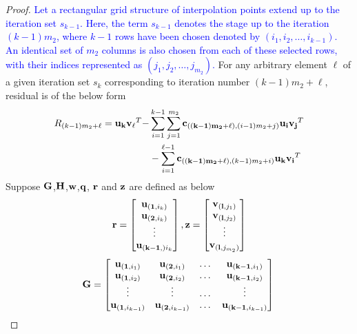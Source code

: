 \documentclass{article}
\begin{document}
\begin{proof}
\textcolor{blue}{Let a rectangular grid structure of interpolation points extend up to the iteration set $s_{k-1}$. Here, the term $s_{k-1}$ denotes the stage up to the iteration $(k-1)m_2$, where $k-1$ rows have been chosen denoted by $(i_1,i_2,\dots,i_{k-1})$. An identical set of $m_2$ columns is also chosen from each of these selected rows, with their indices represented as $(j_1,j_2,\dots,j_{m_2})$.}
For any arbitrary element $\ell$ of a given iteration set $s_k$ corresponding to iteration number $(k-1)m_2+\ell$, residual is of the below form
 \begin{equation*}
     \begin{split}
         R_{(k-1)m_2+\ell}=  \bold{u_k}\bold{v_\ell}^T - &\sum_{i=1}^{k-1}\sum_{j=1}^{m_2}\bold{c}_{(\bold{(k-1)m_2+\ell)},(i-1)m_2+j)}\bold{u_i}\bold{v_j}^T \\
         &-\sum_{i=1}^{\ell-1}\bold{c}_{(\bold{(k-1)m_2+\ell)},(k-1)m_2+i)}\bold{u_k}\bold{v_i}^T
     \end{split}
 \end{equation*}
Suppose $\bold{G}$,$\bold{H}$,$\bold{w}$,$\bold{q}$, $\bold{r}$ and $\bold{z}$ are defined as below
 \begin{equation*}
     \bold{r}=\begin{bmatrix}
\bold{u}_{(\bold{1},i_k)}\\ \bold{u}_{(\bold{2},i_k)}\\ \vdots \\ \bold{u}_{(\bold{k-1},)i_k}
\end{bmatrix},\bold{z}=\begin{bmatrix}
\bold{v}_{(\bold{l},j_1)}\\ \bold{v}_{(\bold{l},j_2)}\\ \vdots \\ \bold{v}_{(\bold{l},j_{m_2})}
\end{bmatrix}
 \end{equation*}
\begin{equation*}
    \bold{G}=\begin{bmatrix}
\bold{u}_{(\bold{1},i_1)} & \bold{u}_{(\bold{2},i_1)} & \dots & \bold{u}_{(\bold{k-1},i_1)}  \\
\bold{u}_{(\bold{1},i_2)} & \bold{u}_{(\bold{2},i_2)} & \dots & \bold{u}_{(\bold{k-1},i_2)} \\
\vdots & \vdots & \dots & \vdots \\
\bold{u}_{(\bold{1},i_{k-1})} & \bold{u}_{(\bold{2},i_{k-1})} & \dots & \bold{u}_{(\bold{k-1},i_{k-1})} \\
\end{bmatrix}\\

\end{equation*}
\end{proof}
\end{document}
